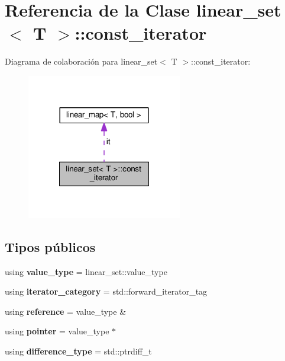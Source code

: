 \hypertarget{classlinear__set_1_1const__iterator}{\section{Referencia de la Clase linear\-\_\-set$<$ T $>$\-:\-:const\-\_\-iterator}
\label{classlinear__set_1_1const__iterator}
}


Diagrama de colaboración para linear\-\_\-set$<$ T $>$\-:\-:const\-\_\-iterator\-:
\nopagebreak
\begin{figure}[H]
\begin{center}
\leavevmode
\includegraphics[width=192pt]{classlinear__set_1_1const__iterator__coll__graph}
\end{center}
\end{figure}
\subsection*{Tipos públicos}
\begin{DoxyCompactItemize}
\item 
\hypertarget{classlinear__set_1_1const__iterator_aeeb487937ec4d79cb6a1a08e73ac1f99}{using {\bfseries value\-\_\-type} = linear\-\_\-set\-::value\-\_\-type}\label{classlinear__set_1_1const__iterator_aeeb487937ec4d79cb6a1a08e73ac1f99}

\item 
\hypertarget{classlinear__set_1_1const__iterator_aa1f033d1d6817bba87a8a56db432f2e0}{using {\bfseries iterator\-\_\-category} = std\-::forward\-\_\-iterator\-\_\-tag}\label{classlinear__set_1_1const__iterator_aa1f033d1d6817bba87a8a56db432f2e0}

\item 
\hypertarget{classlinear__set_1_1const__iterator_a081f0692047d474e34e1ce924d3485ee}{using {\bfseries reference} = value\-\_\-type \&}\label{classlinear__set_1_1const__iterator_a081f0692047d474e34e1ce924d3485ee}

\item 
\hypertarget{classlinear__set_1_1const__iterator_acdc3e59c21faf9becf4c4dcf4ca1bef2}{using {\bfseries pointer} = value\-\_\-type $\ast$}\label{classlinear__set_1_1const__iterator_acdc3e59c21faf9becf4c4dcf4ca1bef2}

\item 
\hypertarget{classlinear__set_1_1const__iterator_ab68189d3b549fd08aea83d540cb7a1b0}{using {\bfseries difference\-\_\-type} = std\-::ptrdiff\-\_\-t}\label{classlinear__set_1_1const__iterator_ab68189d3b549fd08aea83d540cb7a1b0}

\end{DoxyCompactItemize}
